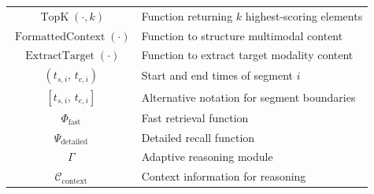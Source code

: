 \begin{table}[h]
\begin{tabular}{@{}cl@{}}
$\operatorname{TopK}(\cdot, k)$ & Function returning $k$ highest-scoring elements \\
$\operatorname{FormattedContext}(\cdot)$ & Function to structure multimodal content \\
$\operatorname{ExtractTarget}(\cdot)$ & Function to extract target modality content \\
$(t_{s,i},\, t_{e,i})$ & Start and end times of segment $i$ \\
$[t_{s,i},\, t_{e,i}]$ & Alternative notation for segment boundaries \\
$\Phi_{\text{fast}}$ & Fast retrieval function \\
$\Psi_{\text{detailed}}$ & Detailed recall function \\
$\Gamma$ & Adaptive reasoning module \\
$\mathcal{C}_{\text{context}}$ & Context information for reasoning \\
\bottomrule
\end{tabular}
\end{table}
